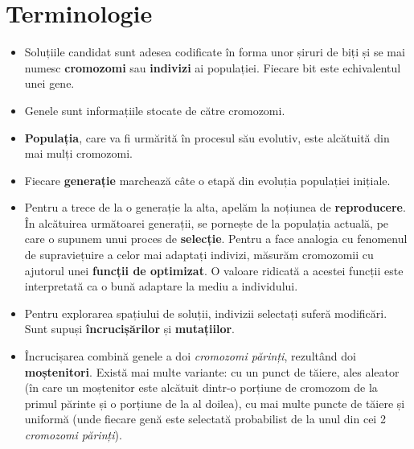 \section{Terminologie}

\begin{itemize}
	
	 \item Soluțiile candidat sunt adesea codificate în forma unor șiruri de biți și se mai numesc \textbf{cromozomi} sau \textbf{indivizi} ai populației. Fiecare bit este echivalentul unei gene. 
	 
	 \item Genele sunt informațiile stocate de către cromozomi. 
	 
	 \item \textbf{Populația}, care va fi urmărită în procesul său evolutiv, este alcătuită din mai mulți cromozomi. 
	 
	 \item Fiecare \textbf{generație} marchează câte o etapă din evoluția populației inițiale. 
	 
	 \item Pentru a trece de la o generație la alta, apelăm la noțiunea de \textbf{reproducere}. În alcătuirea următoarei generații, se pornește de la populația actuală, pe care o supunem unui proces de \textbf{selecție}. Pentru a face analogia cu fenomenul de supraviețuire a celor mai adaptați indivizi, măsurăm cromozomii cu ajutorul unei \textbf{funcții de optimizat}. O valoare ridicată a acestei funcții este interpretată ca o bună adaptare la mediu a individului.  
	 
	 \item Pentru explorarea spațiului de soluții, indivizii selectați suferă modificări. Sunt supuși \textbf{încrucișărilor} și \textbf{mutațiilor}. 
	 
	 \item Încrucișarea combină genele a doi \textit{cromozomi părinți}, rezultând doi \textbf{moștenitori}. Există mai multe variante: cu un punct de tăiere, ales aleator (în care un moștenitor este alcătuit dintr-o porțiune de cromozom de la primul părinte și o porțiune de la al doilea), cu mai multe puncte de tăiere și uniformă (unde fiecare genă este selectată probabilist de la unul din cei 2 \textit{cromozomi părinți}). 
	 

\end{itemize}
